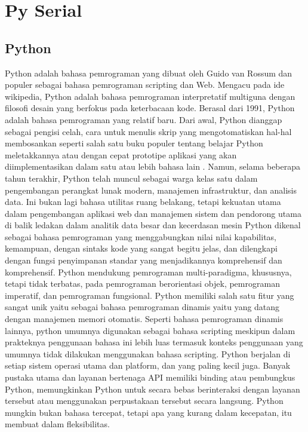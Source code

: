 \section{Py Serial}

	\subsection{Python}
	Python adalah bahasa pemrograman yang dibuat oleh Guido van Rossum dan populer sebagai bahasa pemrograman scripting dan Web. Mengacu pada ide wikipedia, Python adalah bahasa pemrograman interpretatif multiguna dengan filosofi desain yang berfokus pada keterbacaan kode. 
	Berasal dari 1991, Python adalah bahasa pemrograman yang relatif baru. Dari awal, Python dianggap sebagai pengisi celah, cara untuk menulis skrip yang mengotomatiskan hal-hal membosankan seperti salah satu buku populer tentang belajar Python meletakkannya atau dengan cepat prototipe aplikasi yang akan diimplementasikan dalam satu atau lebih bahasa lain .
	Namun, selama beberapa tahun terakhir, Python telah muncul sebagai warga kelas satu dalam pengembangan perangkat lunak modern, manajemen infrastruktur, dan analisis data. Ini bukan lagi bahasa utilitas ruang belakang, tetapi kekuatan utama dalam pengembangan aplikasi web dan manajemen sistem dan pendorong utama di balik ledakan dalam analitik data besar dan kecerdasan mesin
	Python dikenal sebagai bahasa pemrograman yang menggabungkan nilai nilai kapabilitas, kemampuan, dengan sintaks kode yang sangat begitu jelas, dan dilengkapi dengan fungsi penyimpanan standar yang menjadikannya komprehensif dan komprehensif. 
	Python mendukung pemrograman multi-paradigma, khususnya, tetapi tidak terbatas, pada pemrograman berorientasi objek, pemrograman imperatif, dan pemrograman fungsional. 
	Python memiliki salah satu fitur yang sangat unik yaitu sebagai bahasa pemrograman dinamis yaitu yang datang dengan manajemen memori otomatis. Seperti bahasa 
	pemrograman dinamis lainnya, python umumnya digunakan sebagai bahasa scripting meskipun dalam prakteknya penggunaan bahasa ini lebih luas termasuk konteks penggunaan yang umumnya tidak dilakukan menggunakan bahasa scripting. 
	Python berjalan di setiap sistem operasi utama dan platform, dan yang paling kecil juga. Banyak pustaka utama dan layanan bertenaga API memiliki binding atau pembungkus Python, memungkinkan Python untuk secara bebas berinteraksi dengan layanan tersebut atau menggunakan perpustakaan tersebut secara langsung. Python mungkin bukan bahasa tercepat, tetapi apa yang kurang dalam kecepatan, itu membuat dalam fleksibilitas.
